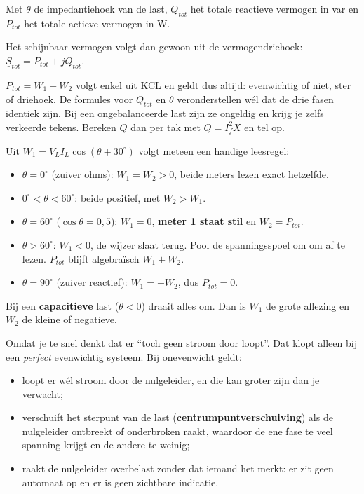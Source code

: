 \documentclass[a4paper,11pt]{article}
\begin{document}
{Met $\theta$ de impedantiehoek van de last, $Q_{tot}$ het totale reactieve vermogen in var en
    $P_{tot}$ het totale actieve vermogen in W.}

Het schijnbaar vermogen volgt dan gewoon uit de vermogendriehoek:
$\underline{S}_{tot} = P_{tot} + jQ_{tot}$.

$P_{tot} = W_1 + W_2$ volgt enkel uit KCL en geldt dus altijd: evenwichtig of niet, ster of
driehoek. De formules voor $Q_{tot}$ en $\theta$ veronderstellen wél dat de drie fasen identiek
zijn. Bij een ongebalanceerde last zijn ze ongeldig en krijg je zelfs verkeerde tekens. Bereken $Q$
dan per tak met $Q = I_f^2 X$ en tel op.

\begin{theorie}
    Uit $W_1 = V_L I_L \cos(\theta + 30^\circ)$ volgt meteen een handige leesregel:
    \begin{itemize}
        \item $\theta = 0^\circ$ (zuiver ohms): $W_1 = W_2 > 0$, beide meters lezen exact hetzelfde.
        \item $0^\circ < \theta < 60^\circ$: beide positief, met $W_2 > W_1$.
        \item $\theta = 60^\circ$ ($\cos\theta = 0{,}5$): $W_1 = 0$, \textbf{meter 1 staat stil} en
              $W_2 = P_{tot}$.
        \item $\theta > 60^\circ$: $W_1 < 0$, de wijzer slaat terug. Pool de spanningsspoel om om
              af te lezen. $P_{tot}$ blijft algebraïsch $W_1 + W_2$.
        \item $\theta = 90^\circ$ (zuiver reactief): $W_1 = -W_2$, dus $P_{tot} = 0$.
    \end{itemize}
    Bij een \textbf{capacitieve} last ($\theta < 0$) draait alles om. Dan is $W_1$ de grote aflezing
    en $W_2$ de kleine of negatieve.
\end{theorie}

\begin{examenbox}
    Omdat je te snel denkt dat er ``toch geen stroom door loopt''. Dat klopt alleen bij een
    \emph{perfect} evenwichtig systeem. Bij onevenwicht geldt:
    \begin{itemize}
        \item loopt er wél stroom door de nulgeleider, en die kan groter zijn dan je verwacht;
        \item verschuift het sterpunt van de last (\textbf{centrumpuntverschuiving}) als de
              nulgeleider ontbreekt of onderbroken raakt, waardoor de ene fase te veel spanning
              krijgt en de andere te weinig;
        \item raakt de nulgeleider overbelast zonder dat iemand het merkt: er zit geen automaat op en
              er is geen zichtbare indicatie.
    \end{itemize}
\end{examenbox}
\end{document}
